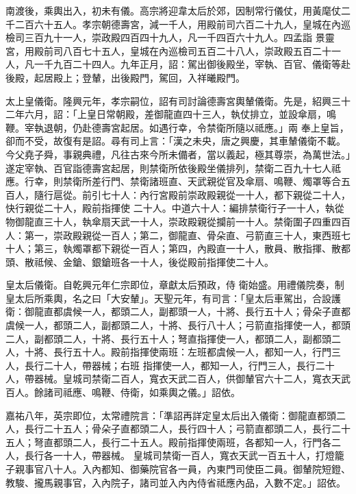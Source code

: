\begin{pinyinscope}
 南渡後，乘輿出入，初未有儀。高宗將迎韋太后於郊，因制常行儀仗，用黃麾仗二千二百六十五人。孝宗朝德壽宮，減一千人，用殿前司六百二十九人，皇城在內巡檢司三百九十一人，崇政殿四百四十九人，凡一千四百六十九人。四孟詣
 景靈宮，用殿前司八百七十五人，皇城在內巡檢司五百二十八人，崇政殿五百二十一人，凡一千九百二十四人。九年正月，詔：駕出御後殿坐，宰執、百官、儀衛等赴後殿，起居殿上；登輦，出後殿門，駕回，入祥曦殿門。



 太上皇儀衛。隆興元年，孝宗嗣位，詔有司討論德壽宮輿輦儀衛。先是，紹興三十二年六月，詔：「上皇日常朝殿，差御龍直四十三人，執仗排立，並設傘扇，鳴鞭。宰執退朝，仍赴德壽宮起居。如遇行幸，令禁衛所隨以祗應。」兩
 奉上皇旨，卻而不受，故復有是詔。尋有司上言：「漢之未央，唐之興慶，其車輦儀衛不載。今父堯子舜，事親典禮，凡往古來今所未備者，當以義起，極其尊崇，為萬世法。」遂定宰執、百官詣德壽宮起居，則禁衛所依後殿坐儀排列，禁衛二百九十七人祗應。行幸，則禁衛所差行門、禁衛諸班直、天武親從官及傘扇、鳴鞭、燭罩等合五百人，隨行扈從。前引七十人：內行宮殿前崇政殿親從一十人，都下親從二十人，快行親從二十人，殿前指揮使
 二十人。中道六十人：編排禁衛行子一十人，執從物御龍直三十人，執傘扇天武一十人，崇政殿親從攔前一十人。禁衛圍子四重四百人：第一，崇政殿親從一百人；第二，御龍直、骨朵直、弓箭直三十人，東西班七十人；第三，執燭罩都下親從一百人；第四，內殿直一十人，散員、散指揮、散都頭、散祗候、金鎗、銀鎗班各一十人，後從殿前指揮使二十人。



 皇太后儀衛。自乾興元年仁宗即位，章獻太后預政，侍
 衛始盛。用禮儀院奏，制皇太后所乘輿，名之曰「大安輦」。天聖元年，有司言：「皇太后車駕出，合設護衛：御龍直都虞候一人，都頭二人，副都頭一人，十將、長行五十人；骨朵子直都虞候一人，都頭二人，副都頭二人，十將、長行八十人；弓箭直指揮使一人，都頭二人，副都頭二人，十將、長行五十人；弩直指揮使一人，都頭二人，副都頭二人，十將、長行五十人。殿前指揮使兩班：左班都虞候一人，都知一人，行門三人，長行二十人，帶器械；右班
 指揮使一人，都知一人，行門三人，長行二十人，帶器械。皇城司禁衛二百人，寬衣天武二百人，供御輦官六十二人，寬衣天武百人。餘諸司祗應、鳴鞭、侍衛，如乘輿之儀。」詔依。



 嘉祐八年，英宗即位，太常禮院言：「準詔再詳定皇太后出入儀衛：御龍直都頭二人，長行二十五人；骨朵子直都頭二人，長行四十人；弓箭直都頭二人，長行二十五人；弩直都頭二人，長行二十五人。殿前指揮使兩班，各都知一人，行門各二人，長行各一十人，帶器械。
 皇城司禁衛一百人，寬衣天武一百五十人，打燈籠子親事官八十人。入內都知、御藥院官各一員，內東門司使臣二員。御輦院短鐙、教駿、攏馬親事官，入內院子，諸司並入內內侍省祗應內品，入數不定。」詔依。




\end{pinyinscope}
